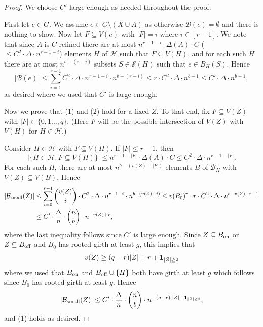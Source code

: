 \documentclass[11pt]{article}
\newcommand{\mc}[1]{\mathcal{#1}}
\newcounter{i}
\theoremstyle{plain}
\theoremstyle{plain} %
\theoremstyle{definition}
\begin{document}
\begin{proof}
We choose $C'$ large enough as needed throughout the proof.

First let $e\in G$. We assume $e\in G \setminus (X\cup A)$ as otherwise $\mc{B}(e)=\emptyset$ and there is nothing to show. Now let $F\subseteq V(e)$ with $|F|=i$ where $i\in [r-1]$. We note that since $A$ is $C$-refined there are at most $n^{r-1-i}\cdot \Delta(A) \cdot C$ ($\le C^2 \cdot \Delta \cdot n^{r-1-i}$) elements $H$ of $\mathcal{H}$ such that $F\subseteq V(H)$, and for each such $H$ there are at most $n^{b-(r-i)}$ subsets $S\in \mathcal{S}(H)$ such that $e\in B_H(S)$. Hence 
$$|\mc{B}(e)|\le \sum_{i=1}^{r-1} C^2\cdot \Delta \cdot n^{r-1-i} \cdot n^{b-(r-i)} \le r\cdot C^2 \cdot \Delta\cdot n^{b-1} \le C'\cdot \Delta\cdot n^{b-1},$$
as desired where we used that $C'$ is large enough.


Now we prove that (1) and (2) hold for a fixed $Z$. To that end, fix $F\subseteq V(Z)$ with $|F|\in \{0,1\ldots,q\}$. (Here $F$ will be the possible intersection of $V(Z)$ with $V(H)$ for $H\in \mc{H}$.) 

Consider $H\in \mc{H}$ with $F\subseteq V(H)$. If $|F| \le r-1$, then
$$|\{H\in \mc{H}: F\subseteq V(H)\}| \le n^{r-1-|F|}\cdot \Delta(A)\cdot C \le C^2\cdot \Delta \cdot n^{r-1-|F|}.$$
For each such $H$, there are at most $n^{b - (v(Z)-|F|)}$ elements $B$ of $\mc{B}_H$ with $V(Z) \subseteq V(B)$.
Hence
\begin{align*}|\mathcal{B}_{\rm small}(Z)| &\le \sum_{i=0}^{r-1} \binom{v(Z)}{i}\cdot  C^2\cdot \Delta \cdot n^{r-1-i} \cdot n^{b-(v(Z)-i)} \le v(B_0)^r\cdot r\cdot C^2 \cdot \Delta\cdot n^{b-v(Z)+r-1}\\
&\le C'\cdot \frac{\Delta}{n}\cdot \binom{n}{b} \cdot n^{-v(Z)+r},
\end{align*}
where the last inequality follows since $C'$ is large enough.
Since $Z\subseteq B_{\rm on}$ or $Z\subseteq B_{\rm off}$ and $B_0$ has rooted girth at least $g$, this implies that 
$$v(Z) \ge (q-r)|Z|+r+{\bf 1}_{|Z|\ge 2}$$ 
where we used that $B_{\rm on}$ and $B_{\rm off}\cup \{H\}$ both have girth at least $g$ which follows since $B_0$ has rooted girth at least $g$. Hence 
$$|\mathcal{B}_{\rm small}(Z)|\le C'\cdot \frac{\Delta}{n}\cdot \binom{n}{b} \cdot n^{-(q-r)\cdot |Z| - {\bf 1}_{|Z|\ge 2}},$$
and (1) holds as desired.


\end{proof}
\end{document}
